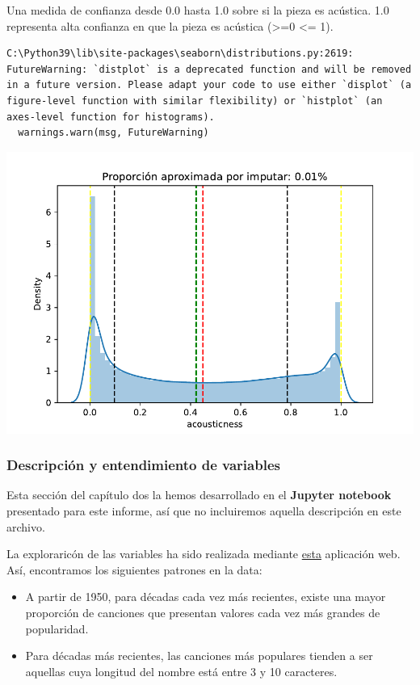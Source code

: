 \documentclass[
  letterpaper,
  DIV=11,
  numbers=noendperiod]{scrartcl}
\providecommand{\tightlist}{%
  \setlength{\itemsep}{0pt}\setlength{\parskip}{0pt}}
\begin{document}
Una medida de confianza desde 0.0 hasta 1.0 sobre si la pieza es
acústica. 1.0 representa alta confianza en que la pieza es acústica
(\textgreater=0 \textbar{} \textless= 1).

\begin{verbatim}
C:\Python39\lib\site-packages\seaborn\distributions.py:2619: FutureWarning: `distplot` is a deprecated function and will be removed in a future version. Please adapt your code to use either `displot` (a figure-level function with similar flexibility) or `histplot` (an axes-level function for histograms).
  warnings.warn(msg, FutureWarning)
\end{verbatim}

\includegraphics{informe_01_files/figure-pdf/unnamed-chunk-28-19.pdf}

\hypertarget{descripciuxf3n-y-entendimiento-de-variables}{%
\subsubsection{Descripción y entendimiento de
variables}\label{descripciuxf3n-y-entendimiento-de-variables}}

Esta sección del capítulo dos la hemos desarrollado en el
\textbf{Jupyter notebook} presentado para este informe, así que no
incluiremos aquella descripción en este archivo.

La exploraricón de las variables ha sido realizada mediante
\href{https://lucio-cornejo.shinyapps.io/chapter-II-dashboard-INF03/}{esta}
aplicación web. Así, encontramos los siguientes patrones en la data:

\begin{itemize}
\tightlist
\item
  A partir de 1950, para décadas cada vez más recientes, existe una
  mayor proporción de canciones que presentan valores cada vez más
  grandes de popularidad.
\item
  Para décadas más recientes, las canciones más populares tienden a ser
  aquellas cuya longitud del nombre está entre 3 y 10 caracteres.
\end{itemize}
\end{document}
